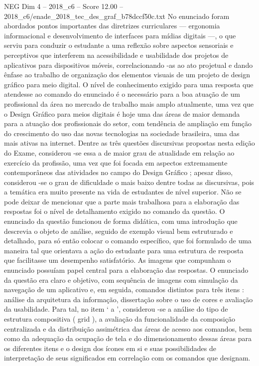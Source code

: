\begin{textsample}{NEG Dim 4 – 2018\_c6 – Score 12.00 – 2018\_c6/enade\_2018\_tec\_des\_graf\_b78dccf50c.txt}
No enunciado foram abordados pontos importantes das diretrizes curriculares — ergonomia informacional e desenvolvimento de interfaces para mídias digitais —, o que serviu para conduzir o estudante a uma reflexão sobre aspectos sensoriais e perceptivos que interferem na acessibilidade e usabilidade dos projetos de aplicativos para dispositivos móveis, correlacionando -as ao ato projetual e dando ênfase ao trabalho de organização dos elementos visuais de um projeto de design gráfico para meio digital.
O nível de conhecimento exigido para uma resposta que atendesse ao comando do enunciado é o necessário para a boa atuação de um profissional da área no mercado de trabalho mais amplo atualmente, uma vez que o Design Gráfico para meios digitais é hoje uma das áreas de maior demanda para a atuação dos profissionais do setor, com tendência de ampliação em função do crescimento do uso das novas tecnologias na sociedade brasileira, uma das mais ativas na internet.
Dentre as três questões discursivas propostas nesta edição do Exame, considerou -se essa a de maior grau de atualidade em relação ao exercício da profissão, uma vez que foi focada em aspectos extremamente contemporâneos das atividades no campo do Design Gráfico ; apesar disso, considerou -se o grau de dificuldade o mais baixo dentre todas as discursivas, pois a temática era muito presente na vida de estudantes de nível superior.
Não se pode deixar de mencionar que a parte mais trabalhosa para a elaboração das respostas foi o nível de detalhamento exigido no comando da questão.
O enunciado da questão funcionou de forma didática, com uma introdução que descrevia o objeto de análise, seguido de exemplo visual bem estruturado e detalhado, para só então colocar o comando específico, que foi formulado de uma maneira tal que orientava a ação do estudante para uma estrutura de resposta que facilitasse um desempenho satisfatório.
As imagens que compunham o enunciado possuíam papel central para a elaboração das respostas.
O enunciado da questão era claro e objetivo, com sequência de imagens com simulação da navegação de um aplicativo e, em seguida, comandos distintos para três itens : análise da arquitetura da informação, dissertação sobre o uso de cores e avaliação da usabilidade.
Para tal, no item ‘ a ’, considerou -se a análise do tipo de estrutura compositiva ( grid ), a avaliação da funcionalidade da composição centralizada e da distribuição assimétrica das áreas de acesso aos comandos, bem como da adequação da ocupação de tela e do dimensionamento dessas áreas para os diferentes itens e o design dos ícones em si e suas possibilidades de interpretação de seus significados em correlação com os comandos que designam.

\end{textsample}
